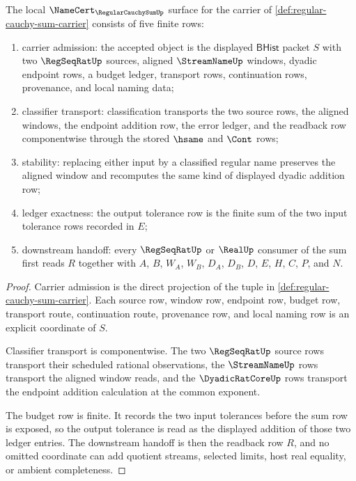 \begin{theorem}
\label{thm:regular-cauchy-sum-namecert-obligations}
The local $\NameCert_{\RegularCauchySumUp}$ surface for the carrier of \autoref{def:regular-cauchy-sum-carrier} consists of five finite rows:
\begin{enumerate}
\item carrier admission: the accepted object is the displayed $\mathsf{BHist}$ packet $S$ with two $\RegSeqRatUp$ sources, aligned $\StreamNameUp$ windows, dyadic endpoint rows, a budget ledger, transport rows, continuation rows, provenance, and local naming data;
\item classifier transport: classification transports the two source rows, the aligned windows, the endpoint addition row, the error ledger, and the readback row componentwise through the stored $\hsame$ and $\Cont$ rows;
\item stability: replacing either input by a classified regular name preserves the aligned window and recomputes the same kind of displayed dyadic addition row;
\item ledger exactness: the output tolerance row is the finite sum of the two input tolerance rows recorded in $E$;
\item downstream handoff: every $\RegSeqRatUp$ or $\RealUp$ consumer of the sum first reads $R$ together with $A$, $B$, $W_A$, $W_B$, $D_A$, $D_B$, $D$, $E$, $H$, $C$, $P$, and $N$.
\end{enumerate}
\end{theorem}
\begin{proof}
Carrier admission is the direct projection of the tuple in \autoref{def:regular-cauchy-sum-carrier}. Each source row, window row, endpoint row, budget row, transport route, continuation route, provenance row, and local naming row is an explicit coordinate of $S$.

Classifier transport is componentwise. The two $\RegSeqRatUp$ source rows transport their scheduled rational observations, the $\StreamNameUp$ rows transport the aligned window reads, and the $\DyadicRatCoreUp$ rows transport the endpoint addition calculation at the common exponent.

The budget row is finite. It records the two input tolerances before the sum row is exposed, so the output tolerance is read as the displayed addition of those two ledger entries. The downstream handoff is then the readback row $R$, and no omitted coordinate can add quotient streams, selected limits, host real equality, or ambient completeness.
\end{proof}

